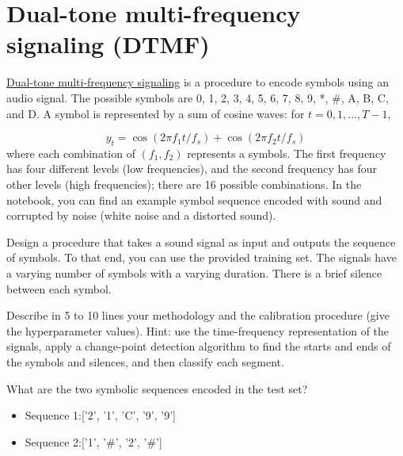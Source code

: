 \documentclass[11pt]{article}
\begin{document}
\newpage
\section{Dual-tone multi-frequency signaling (DTMF)}

\href{https://en.wikipedia.org/wiki/Dual-tone\_multi-frequency\_signaling}{Dual-tone multi-frequency signaling} is a procedure to encode symbols using an audio signal.
The possible symbols are 0, 1, 2, 3, 4, 5, 6, 7, 8, 9, *, \#, A, B, C, and D.
A symbol is represented by a sum of cosine waves: for $t=0,1,\dots, T-1$,

$$
y_t = \cos(2\pi f_1 t/f_s) + \cos(2\pi f_2 t/f_s)
$$
where each combination of $(f_1, f_2)$ represents a symbols.
The first frequency has four different levels (low frequencies), and the second frequency has four other levels (high frequencies); there are 16 possible combinations.
In the notebook, you can find an example symbol sequence encoded with sound and corrupted by noise (white noise and a distorted sound).

\begin{exercise}
Design a procedure that takes a sound signal as input and outputs the sequence of symbols. 
To that end, you can use the provided training set.
The signals have a varying number of symbols with a varying duration. 
There is a brief silence between each symbol.

Describe in 5 to 10 lines your methodology and the calibration procedure (give the hyperparameter values). Hint: use the time-frequency representation of the signals, apply a change-point detection algorithm to find the starts and ends of the symbols and silences, and then classify each segment. 

\end{exercise}
\begin{solution}

\end{solution}

\begin{exercise}
What are the two symbolic sequences encoded in the test set?
\end{exercise}

\begin{solution}
    \begin{itemize}
        \item Sequence 1:['2', '1', 'C', '9', '9']
        \item Sequence 2:['1', '\#', '2', '\#']
    \end{itemize}
\end{solution}
\end{document}

